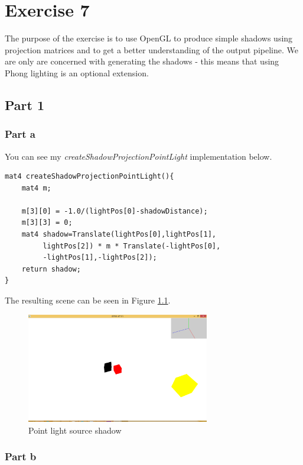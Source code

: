 
\chapter{Exercise 7}
\label{cha:ugeopgave-7}

The purpose of the exercise is to use OpenGL to produce simple shadows using projection matrices and to get a better understanding of the output pipeline. We are only are concerned with generating the shadows - this means that using Phong lighting is an optional extension.

\section{Part 1}

\subsection{Part a}

You can see my \emph{createShadowProjectionPointLight} implementation below.\\

\begin{lstlisting}
mat4 createShadowProjectionPointLight(){
	mat4 m;

	m[3][0] = -1.0/(lightPos[0]-shadowDistance);
	m[3][3] = 0;
 	mat4 shadow=Translate(lightPos[0],lightPos[1], 
         lightPos[2]) * m * Translate(-lightPos[0],
         -lightPos[1],-lightPos[2]);
	return shadow;
}
\end{lstlisting}

The resulting scene can be seen in Figure \ref{fig:7-1-1}.

\begin{figure}[hp]
\centering
\includegraphics[width=8cm]{../Screenshots/ex-7/1-1.png}
\caption{Point light source shadow}
\label{fig:7-1-1}
\end{figure} 

\subsection{Part b}

